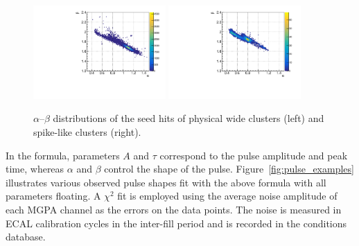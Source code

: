 \begin{figure}[tbp]
  \begin{center}
    \includegraphics[width=0.45\textwidth]{Reconstruction/Figures/spikes/alphabeta_physical.pdf}
    \includegraphics[width=0.45\textwidth]{Reconstruction/Figures/spikes/alphabeta_spike.pdf}
    \caption{
      $\alpha$--$\beta$ distributions of the seed hits of physical wide clusters (left) and spike-like clusters (right).
    }
    \label{fig:spike_alphabeta}
  \end{center}
\end{figure}

In the formula, parameters $A$ and $\tau$ correspond to the pulse amplitude and peak time, whereas $\alpha$ and $\beta$ control the shape of the pulse. 
Figure~\ref{fig:pulse_examples} illustrates various observed pulse shapes fit with the above formula with all parameters floating. 
A $\chi^{2}$ fit is employed using the average noise amplitude of each MGPA channel as the errors on the data points. 
The noise is measured in ECAL calibration cycles in the inter-fill period and is recorded in the conditions database.

